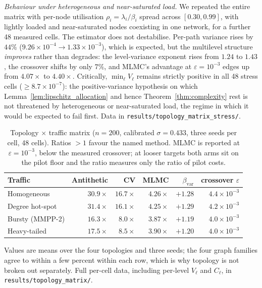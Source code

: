 \documentclass{ieeeaccess}
\begin{document}
\textit{Behaviour under heterogeneous and near-saturated load.}
We repeated the entire matrix with per-node utilisation $\rho_i=\lambda_i/\beta_i$ spread across
$[0.30, 0.99]$, with lightly loaded and near-saturated nodes coexisting in one network, for a
further 48 measured cells. The estimator does not destabilise. Per-path variance rises by $44\%$
($9.26\times10^{-4}\to1.33\times10^{-3}$), which is expected, but the multilevel structure
\emph{improves} rather than degrades: the level-variance exponent rises from $1.24$ to $1.43$,
the crossover shifts by only $7\%$, and MLMC's advantage at $\varepsilon{=}10^{-3}$ edges up from
$4.07\times$ to $4.40\times$. Critically, $\min_\ell V_\ell$ remains strictly positive in all 48
stress cells ($\geq8.7\times10^{-7}$): the positive-variance hypothesis on which
Lemma~\ref{lem:lipschitz_allocation} and hence Theorem~\ref{thm:complexity} rest is not
threatened by heterogeneous or near-saturated load, the regime in which it would be expected to
fail first. Data in \texttt{results/topology\_matrix\_stress/}.

\begin{table}[tb]
\caption{Topology $\times$ traffic matrix ($n{=}200$, calibrated $\sigma{=}0.433$, three seeds
per cell, 48 cells). Ratios $>1$ favour the named method. MLMC is reported at
$\varepsilon{=}10^{-3}$, below the measured crossover; at looser targets both arms sit on the
pilot floor and the ratio measures only the ratio of pilot costs.}
\label{tab:topology_matrix}
\centering\footnotesize
\setlength{\tabcolsep}{3.5pt}
\begin{tabular}{@{}l r r r r r@{}}
\toprule
Traffic & Antithetic & CV & MLMC & $\beta_{\mathrm{var}}$ & crossover $\varepsilon$ \\
\midrule
Homogeneous       & $30.9\times$ & $16.7\times$ & $4.26\times$ & $+1.28$ & $4.4\times10^{-3}$ \\
Degree hot-spot   & $31.4\times$ & $16.1\times$ & $4.25\times$ & $+1.29$ & $4.2\times10^{-3}$ \\
Bursty (MMPP-2)   & $16.3\times$ & $8.0\times$  & $3.87\times$ & $+1.19$ & $4.0\times10^{-3}$ \\
Heavy-tailed      & $17.5\times$ & $8.5\times$  & $3.90\times$ & $+1.20$ & $4.0\times10^{-3}$ \\
\bottomrule
\end{tabular}
\vspace{2pt}
\footnotesize Values are means over the four topologies and three seeds; the four graph families
agree to within a few percent within each row, which is why topology is not broken out
separately. Full per-cell data, including per-level $V_\ell$ and $C_\ell$, in
\texttt{results/topology\_matrix/}.
\end{table}
\end{document}
